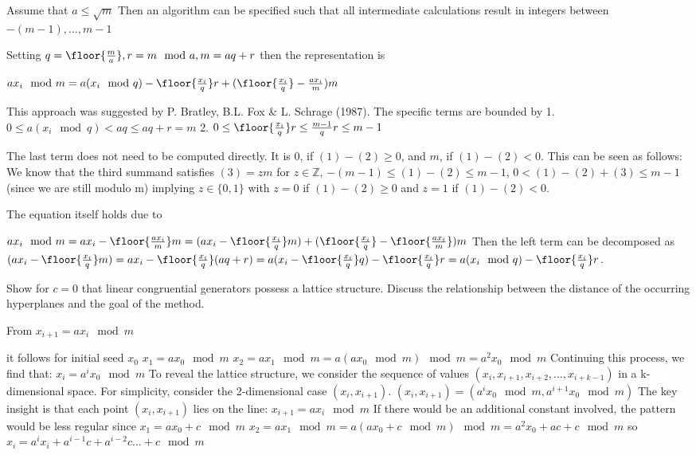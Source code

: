 Assume that
\( a \leq \sqrt{m} \)
Then an algorithm can be specified such that all intermediate calculations result in integers between
\( −(m − 1), \dots, m − 1 \)

Setting \( q = \floor{\frac{m}{a}}, r = m \mod a, m = aq + r \) then the representation is

\( ax_i \mod m = a(x_i \mod q) - \floor{\frac{x_i}{q}}r + (\floor{\frac{x_i}{q}} - \frac{ax_i}{m})m\)

This approach was suggested by P. Bratley, B.L. Fox & L. Schrage (1987).
The specific terms are bounded by
1. \( 0 \leq a (x_i \mod q) < aq ≤ aq + r = m \)
2. \( 0 \leq \floor{\frac{x_i}{q}}r \leq \frac{m-1}{q}r \leq m - 1 \)

The last term does not need to be computed directly. It is \( 0 \), if \( (1) − (2) \geq 0 \), and \( m \), if \( (1) − (2) < 0 \).
This can be seen as follows:
We know that the third summand satisfies \((3) = zm \) for \( z \in \mathbb{Z} \), \( −(m − 1) \leq (1) − (2) \leq m − 1 \), \( 0 < (1) − (2) + (3) \leq m − 1 \) 
(since we are still modulo m)
implying \( z \in \{0, 1\} \) with \( z = 0 \) if \( (1) − (2) \geq 0 \) and \(z = 1\) if \((1) − (2) < 0 \).

The equation itself holds due to

\( ax_i \mod m = ax_i - \floor{\frac{ax_i}{m}}m = (ax_i - \floor{\frac{x_i}{q}}m) + (\floor{\frac{x_i}{q}} - \floor{\frac{ax_i}{m}})m\)
Then the left term can be decomposed as 
\( (ax_i - \floor{\frac{x_i}{q}}m) = ax_i - \floor{\frac{x_i}{q}}(aq + r) = a(x_i - \floor{\frac{x_i}{q}}q) - \floor{\frac{x_i}{q}}r = a(x_i \mod q) - \floor{\frac{x_i}{q}}r \).


Show for \(c = 0\) that linear congruential generators possess a lattice structure.
Discuss the relationship between the distance of the occurring hyperplanes and
the goal of the method.

From 
\(
x_{i+1} = a x_i \mod m
\)

it follows for initial seed \( x_0 \)
\(
x_1 = a x_0 \mod m
\)
\(
x_2 = a x_1 \mod m = a (a x_0 \mod m) \mod m = a^2 x_0 \mod m
\)
Continuing this process, we find that:
\(
x_i = a^i x_0 \mod m
\)
To reveal the lattice structure, we consider the sequence of values \( (x_i, x_{i+1}, x_{i+2}, \ldots, x_{i+k-1}) \) in a k-dimensional space. 
For simplicity, consider the 2-dimensional case \( (x_i, x_{i+1}) \).
\(
(x_i, x_{i+1}) = (a^i x_0 \mod m, a^{i+1} x_0 \mod m)
\)
The key insight is that each point \( (x_i, x_{i+1}) \) lies on the line:
\(
x_{i+1} = a x_i \mod m
\)
If there would be an additional constant involved, the pattern would be less regular since
\(
x_1 = a x_0 + c\mod m
\)
\(
x_2 = a x_1 \mod m = a (a x_0 + c \mod m) \mod m = a^2 x_0 + ac + c\mod m
\)
so 
\(
x_{i} = a^i x_i + a^{i-1}c + a^{i-2}c \dots + c\mod m
\)

